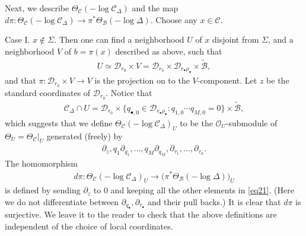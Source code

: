 \documentclass[12pt,b5paper,notitlepage]{report}
\theoremstyle{definition}
\theoremstyle{plain}
\newcommand{\mc}{\mathcal}
\newcommand{\wtd}{\widetilde}
\newcommand{\scr}{\mathscr}
\newcommand{\blt}{\bullet}
\numberwithin{equation}{section}
\begin{document}
Next, we describe $\Theta_{\mc C}(-\log \mc C_\Delta)$ and the map $d\pi:\Theta_{\mc C}(-\log \mc C_\Delta)\rightarrow\pi^*\Theta_{\mc B}(-\log\Delta)$. Choose any $x\in\mc C$. 

Case I. $x\notin\Sigma$. Then one can find a neighborhood $U$ of $x$ disjoint from $\Sigma$, and a neighborhood $V$ of $b=\pi(x)$ described as above, such that
\begin{gather*}
U\simeq \mc D_{r_0}\times V=\mc D_{r_0}\times\mc D_{r_\blt\rho_\blt}\times\wtd{\mc B},
\end{gather*}
and that $\pi: \mc D_{r_0}\times V\rightarrow V$ is the projection on to the $V$-component. Let $z$ be the standard coordinates of $\mc D_{r_0}$. Notice that
\begin{gather*}
\mc C_\Delta\cap U=\mc D_{r_0}\times\{q_{\blt,0}\in\mc D_{r_\blt\rho_\blt}:q_{1,0}\cdots q_{M,0}=0\}\times\wtd{\mc B},
\end{gather*}
which suggests that we define $\Theta_{\mc C}(-\log \mc C_\Delta)_U$ to be the $\scr O_U$-submodule of $\Theta_U=\Theta_{\mc C}|_U$ generated (freely) by
\begin{align}
\partial_z,q_1\partial_{q_1},\dots,q_M\partial_{q_M},\partial_{\tau_1},\dots,\partial_{\tau_n}.\label{eq21}
\end{align}
The homomorphism
\begin{align}
d\pi:\Theta_{\mc C}(-\log \mc C_\Delta)_U\rightarrow \big(\pi^*\Theta_{\mc B}(-\log\Delta)\big)_U\label{eq23}
\end{align}
is defined by sending $\partial_z$ to $0$ and keeping all the other elements in \eqref{eq21}. (Here we do not differentiate between $\partial_{q_\blt},\partial_{\tau_\blt}$ and their pull backs.) It is clear that $d\pi$ is surjective. We leave it to the reader to check that the above definitions are independent of the choice of local coordinates.
\end{document}
